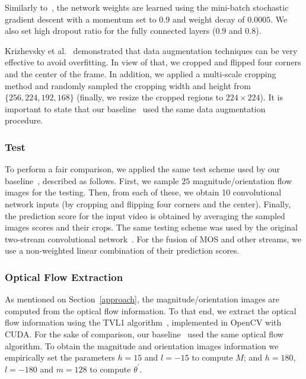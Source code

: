 \documentclass[10pt,conference]{IEEEtran}
\begin{document}
Similarly to~\cite{Simonyan:2014, Wang:2015}, the network weights are learned using the mini-batch stochastic gradient descent with a momentum set to $0.9$ and weight decay of $0.0005$. We also set high dropout ratio for the fully connected layers ($0.9$ and $0.8$).

Krizhevsky et al.~\cite{Krizhevsky:2012} demonstrated that data augmentation techniques can be very effective to avoid overfitting. In view of that, we cropped and flipped four corners and the center of the frame. In addition, we applied a multi-scale cropping method and randomly sampled the cropping width and height from $\{256, 224, 192, 168\}$ (finally, we resize the cropped regions to $224 \times 224$). It is important to state that our baseline~\cite{Wang:2015} used the same data augmentation procedure.

\subsubsection{Test} 

To perform a fair comparison, we applied the same test scheme used by our baseline~\cite{Wang:2015}, described as follows. First, we sample $25$ magnitude/orientation flow images for the testing. Then, from each of these, we obtain 10 convolutional network inputs (by cropping and flipping four corners and the center). Finally, the prediction score for the input video is obtained by averaging the sampled images scores and their crops. The same testing scheme was used by the original two-stream convolutional network~\cite{Simonyan:2014}. For the fusion of MOS and other streams, we use a non-weighted linear combination of their prediction scores.

\subsubsection{Optical Flow Extraction}

As mentioned on Section~\ref{approach}, the magnitude/orientation images are computed from the optical flow information. To that end, we extract the optical flow information using the TVL1 algorithm~\cite{Zach:2007}, implemented in OpenCV with CUDA. For the sake of comparison, our baseline~\cite{Wang:2015} used the same optical flow algorithm. To obtain the magnitude and orientation images information we empirically set the parameters $h = 15$ and $l = -15$ to compute $M$; and $h = 180$, $l = -180$ and $m = 128$ to compute $\theta^{'}$.
\end{document}
